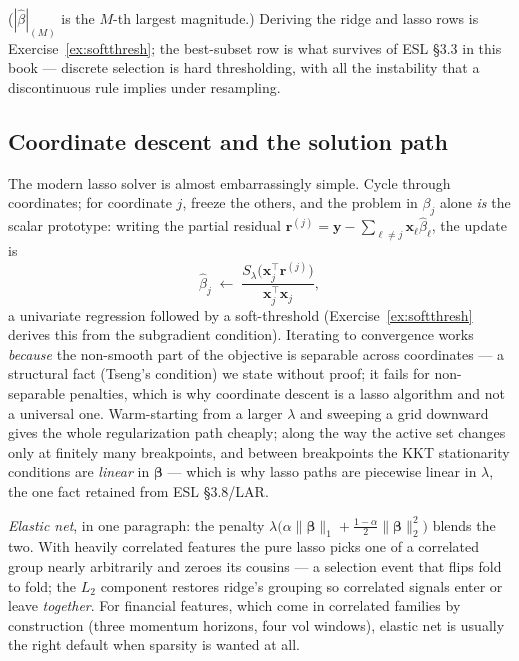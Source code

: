 \documentclass[11pt]{article}
\numberwithin{equation}{section}
\theoremstyle{plain}
\theoremstyle{definition}
\theoremstyle{remark}
\newcommand{\x}{\bm{x}}
\newcommand{\y}{\bm{y}}
\newcommand{\bbeta}{\bm{\beta}}
\newcommand{\T}{\top}
\begin{document}
\noindent ($|\hat\beta|_{(M)}$ is the $M$-th largest magnitude.) Deriving the ridge and lasso rows is Exercise~\ref{ex:softthresh}; the best-subset row is what survives of ESL \S3.3 in this book --- discrete selection is hard thresholding, with all the instability that a discontinuous rule implies under resampling.

\subsection{Coordinate descent and the solution path}

The modern lasso solver is almost embarrassingly simple. Cycle through coordinates; for coordinate $j$, freeze the others, and the problem in $\beta_j$ alone \emph{is} the scalar prototype: writing the partial residual $\bm{r}^{(j)} = \y - \sum_{\ell \ne j} \x_\ell \hat\beta_\ell$, the update is
\begin{equation}
\hat\beta_j \;\leftarrow\; \frac{S_\lambda\big( \x_j^\T \bm{r}^{(j)} \big)}{\x_j^\T \x_j},
\label{eq:cd}
\end{equation}
a univariate regression followed by a soft-threshold (Exercise~\ref{ex:softthresh} derives this from the subgradient condition). Iterating to convergence works \emph{because} the non-smooth part of the objective is separable across coordinates --- a structural fact (Tseng's condition) we state without proof; it fails for non-separable penalties, which is why coordinate descent is a lasso algorithm and not a universal one. Warm-starting from a larger $\lambda$ and sweeping a grid downward gives the whole regularization path cheaply; along the way the active set changes only at finitely many breakpoints, and between breakpoints the KKT stationarity conditions are \emph{linear} in $\bbeta$ --- which is why lasso paths are piecewise linear in $\lambda$, the one fact retained from ESL \S3.8/LAR.

\emph{Elastic net}, in one paragraph: the penalty $\lambda\big(\alpha \|\bbeta\|_1 + \tfrac{1-\alpha}{2}\|\bbeta\|_2^2\big)$ blends the two. With heavily correlated features the pure lasso picks one of a correlated group nearly arbitrarily and zeroes its cousins --- a selection event that flips fold to fold; the $L_2$ component restores ridge's grouping so correlated signals enter or leave \emph{together}. For financial features, which come in correlated families by construction (three momentum horizons, four vol windows), elastic net is usually the right default when sparsity is wanted at all.
\end{document}
